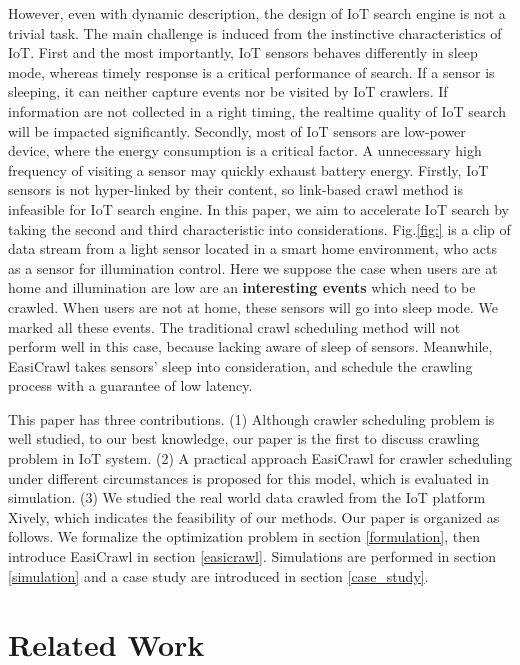 \documentclass[conference]{IEEEtran}
\begin{document}
However, even with dynamic description, the design of IoT search engine is not a trivial task. The main challenge is induced from the instinctive characteristics of IoT. 
First and the most importantly, IoT sensors behaves differently in sleep mode, whereas timely response is a critical performance of search. If a sensor is sleeping, it can neither capture events nor be visited by IoT crawlers. If information are not collected in a right timing, the realtime quality of IoT search will be impacted significantly.
Secondly, most of IoT sensors are low-power device, where the energy consumption is a critical factor. A unnecessary high frequency of visiting a sensor may quickly exhaust battery energy.
Firstly, IoT sensors is not hyper-linked by their content, so link-based crawl method is infeasible for IoT search engine. 
In this paper, we aim to accelerate IoT search by taking the second and third characteristic into considerations.
Fig.\ref{fig:} is a clip of data stream from a light sensor located in a smart home environment, who acts as a sensor for illumination control. Here we suppose the case when users are at home and illumination are low are an \textbf{interesting events} which need to be crawled. When users are not at home, these sensors will go into sleep mode. We marked all these events.
The traditional crawl scheduling method will not perform well in this case, because lacking aware of sleep of sensors.
Meanwhile, EasiCrawl takes sensors' sleep into consideration, and schedule the crawling process with a guarantee of low latency.


This paper has three contributions.
(1) Although crawler scheduling problem is well studied, to our best knowledge, our paper is the first to discuss crawling problem in IoT system.
(2) A practical approach EasiCrawl for crawler scheduling under different circumstances is proposed for this model, which is evaluated in simulation.
(3) We studied the real world data crawled from the IoT platform Xively\cite{xively}, which indicates the feasibility of our methods.
Our paper is organized as follows. 
We formalize the optimization problem in section \ref{formulation}, then introduce EasiCrawl in section \ref{easicrawl}. Simulations are performed in section \ref{simulation} and a case study are introduced in section \ref{case_study}. 

\section{Related Work}\label{related_work}
\end{document}
